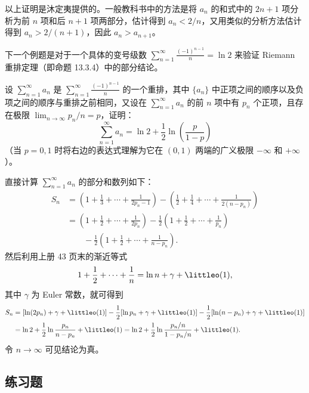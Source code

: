 \begin{xremark}
以上证明是沐定夷提供的。一般教科书中的方法是将 $a_n$ 的和式中的 $2n+1$ 项分析为前 $n$ 项和后 $n+1$ 项两部分，估计得到 $a_n<2/n$，又用类似的分析方法估计得到 $a_n>2/(n+1)$，因此 $a_n>a_{n+1}$。
\end{xremark}

下一个例题是对于一个具体的变号级数 $\sum_{n=1}^{\infty}\frac{(-1)^{n-1}}n=\ln2$ 来验证 Riemann 重排定理（即命题 13.3.4）中的部分结论。

\begin{xexample}[13.3.5]
设 $\sum_{n=1}^{\infty}a_n$ 是 $\sum_{n=1}^{\infty}\frac{(-1)^{n-1}}n$ 的一个重排，其中 $\{a_n\}$ 中正项之间的顺序以及负项之间的顺序与重排之前相同，又设在 $\sum_{n=1}^{\infty}a_n$ 的前 $n$ 项中有 $p_n$ 个正项，且存在极限 $\lim_{n\to\infty}p_n/n=p$，证明：
\[
\sum_{n=1}^{\infty}a_n=\ln2+\frac12\ln\left(\frac p{1-p}\right)
\]
（当 $p=0,1$ 时将右边的表达式理解为它在 $(0,1)$ 两端的广义极限 $-\infty$ 和 $+\infty$）。
\end{xexample}
\begin{xproof}
直接计算 $\sum_{n=1}^{\infty}a_n$ 的部分和数列如下：
\[
\begin{aligned}
S_n&=\left(1+\frac13+\cdots+\frac1{2p_n-1}\right)-\left(\frac12+\frac14+\cdots+\frac1{2(n-p_n)}\right)\\
&=\left(1+\frac12+\cdots+\frac1{2p_n}\right)-\frac12\left(1+\frac12+\cdots+\frac1{p_n}\right)\\
&\qquad-\frac12\left(1+\frac12+\cdots+\frac1{n-p_n}\right).
\end{aligned}
\]
然后利用上册 43 页末的渐近等式
\[
1+\frac12+\cdots+\frac1n=\ln n+\gamma+\littleo(1),
\]
其中 $\gamma$ 为 Euler 常数，就可得到
\[
\begin{aligned}
S_n&=[\ln(2p_n)+\gamma+\littleo(1)]-\frac12[\ln p_n+\gamma+\littleo(1)]-\frac12[\ln(n-p_n)+\gamma+\littleo(1)]\\
&=\ln2+\frac12\ln\frac{p_n}{n-p_n}+\littleo(1)
=\ln2+\frac12\ln\frac{p_n/n}{1-p_n/n}+\littleo(1).
\end{aligned}
\]
令 $n\to\infty$ 可见结论为真。
\end{xproof}

\subsection{练习题}

